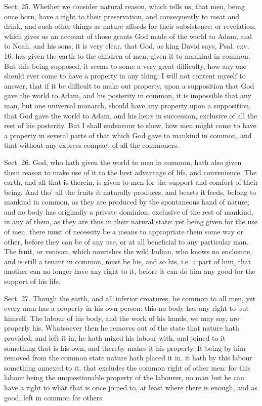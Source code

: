\documentclass[11pt,openany]{book}
\begin{document}
Sect. 25. Whether we consider natural reason, which tells us, that men, being once born, have a right to their preservation, and consequently to meat and drink, and such other things as nature affords for their subsistence: or revelation, which gives us an account of those grants God made of the world to Adam, and to Noah, and his sons, it is very clear, that God, as king David says, Psal. cxv. 16. has given the earth to the children of men; given it to mankind in common. But this being supposed, it seems to some a very great difficulty, how any one should ever come to have a property in any thing: I will not content myself to answer, that if it be difficult to make out property, upon a supposition that God gave the world to Adam, and his posterity in common, it is impossible that any man, but one universal monarch, should have any property upon a supposition, that God gave the world to Adam, and his heirs in succession, exclusive of all the rest of his posterity. But I shall endeavour to shew, how men might come to have a property in several parts of that which God gave to mankind in common, and that without any express compact of all the commoners.

Sect. 26. God, who hath given the world to men in common, hath also given them reason to make use of it to the best advantage of life, and convenience. The earth, and all that is therein, is given to men for the support and comfort of their being. And tho' all the fruits it naturally produces, and beasts it feeds, belong to mankind in common, as they are produced by the spontaneous hand of nature; and no body has originally a private dominion, exclusive of the rest of mankind, in any of them, as they are thus in their natural state: yet being given for the use of men, there must of necessity be a means to appropriate them some way or other, before they can be of any use, or at all beneficial to any particular man. The fruit, or venison, which nourishes the wild Indian, who knows no enclosure, and is still a tenant in common, must be his, and so his, i.e. a part of him, that another can no longer have any right to it, before it can do him any good for the support of his life.

Sect. 27. Though the earth, and all inferior creatures, be common to all men, yet every man has a property in his own person: this no body has any right to but himself. The labour of his body, and the work of his hands, we may say, are properly his. Whatsoever then he removes out of the state that nature hath provided, and left it in, he hath mixed his labour with, and joined to it something that is his own, and thereby makes it his property. It being by him removed from the common state nature hath placed it in, it hath by this labour something annexed to it, that excludes the common right of other men: for this labour being the unquestionable property of the labourer, no man but he can have a right to what that is once joined to, at least where there is enough, and as good, left in common for others.
\end{document}
